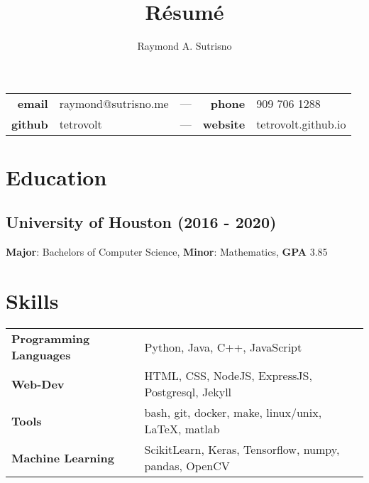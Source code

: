 \documentclass{article}
\title{R\'esum\'e}
\author{Raymond A. Sutrisno}
\date{}
\makeatletter
\renewcommand{\maketitle}{
\begin{center}
{\Large\bfseries\theauthor}
\begin{center}
\begin{tabular}{ r l c r l }
 \textbf{email} & raymond@sutrisno.me & --- & \textbf{phone} & 909 706 1288 \\
 \textbf{github} & tetrovolt & --- & \textbf{website} & tetrovolt.github.io
\end{tabular}
\end{center}
\end{center}
}
\makeatother
\begin{document}
\maketitle

\section{Education}
\subsection{University of Houston (2016 - 2020)}
\textbf{Major}: Bachelors of Computer Science,
\textbf{Minor}: Mathematics,
\textbf{GPA} {3.85}

\section{Skills}
\begin{tabular}{p{5cm} l}
    \textbf{Programming Languages} & Python, Java, C++, JavaScript  \\
    \textbf{Web-Dev} & HTML, CSS, NodeJS, ExpressJS, Postgresql, Jekyll \\
    \textbf{Tools} & bash, git, docker, make, linux/unix, \LaTeX, matlab \\
    \textbf{Machine Learning} & ScikitLearn, Keras, Tensorflow, numpy, pandas, OpenCV
\end{tabular}
\end{document}
